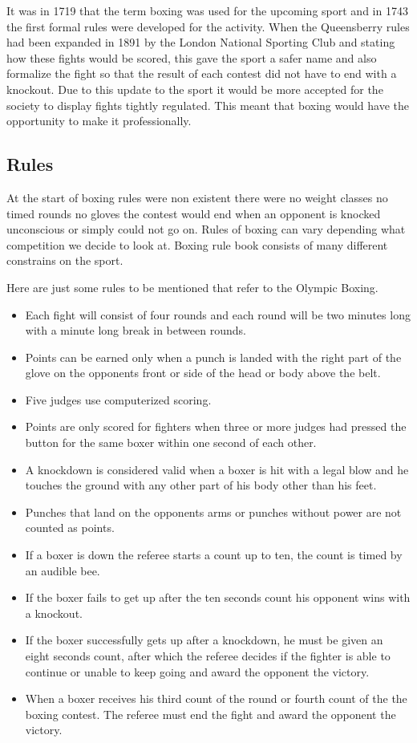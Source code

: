 \documentclass[a4paper,12pt,twoside]{report}
\begin{document}
It was in 1719 that the term boxing was used for the upcoming sport and in 1743 the first formal rules were developed for the activity. When the Queensberry rules had been expanded in 1891 by the London National Sporting Club and stating how these fights would be scored, this gave the sport a safer name and also formalize the fight so that the result of each contest did not have to end with a knockout.
\cite{modernBoxing}
Due to this update to the sport it would be more accepted for the society to display fights tightly regulated. This meant that boxing would have the opportunity to make it professionally. 
\newpage
\subsection{Rules}
At the start of boxing rules were non existent there were no weight classes no timed rounds no gloves the contest would end when an opponent is knocked unconscious or simply could not go on. 
Rules of boxing can vary depending what competition we decide to look at. Boxing rule book consists of many different constrains on the sport.\linebreak

Here are just some rules to be mentioned that refer to the Olympic Boxing.
\begin{itemize}
    \item Each fight will consist of four rounds and each round will be two minutes long with a minute long break in between rounds.
    \item Points can be earned only when a punch is landed with the right part of the glove on the opponents front or side of the head or body above the belt.
    \item Five judges use computerized scoring.
    \item Points are only scored for fighters when three or more judges had pressed the button for the same boxer within one second of each other.
    \item A knockdown is considered valid when a boxer is hit with a legal blow and he touches the ground with any other part of his body other than his feet.
    \item Punches  that land on the opponents arms or punches without power are not counted as points.
    \item If a boxer is down the referee starts a count up to ten, the count is timed by an audible bee.
    \item If the boxer fails to get up after the ten seconds count his opponent wins with a knockout.
    \item If the boxer successfully gets up after a knockdown, he must be given an eight seconds count, after which the referee decides if the fighter is able to continue or unable to keep going and award the opponent the victory.
    \item When a boxer receives his third count of the round or fourth count of the the boxing contest. The referee must end the fight and award the opponent the victory.
\end{itemize}
\cite{lewandowski2012olympic}
\end{document}
